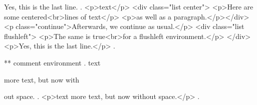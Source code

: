 Yes, this is the last line.
.
<p>text</p>
<div class="list center">
<p>Here are some centered<br>lines of text</p>
<p>as well as a paragraph.</p></div>
<p class="continue">Afterwards, we continue as usual.</p>
<div class="list flushleft">
<p>The same is true<br>for a ﬂushleft environment.</p>
</div>
<p>Yes, this is the last line.</p>
.



** comment environment
.
text
\begin{comment}
    This is a comment.
    \end{comment
    still more comment.
\end{comment}
more text, but now with%
\begin{comment}
    This is a comment.
\end{comment}
out space.
.
<p>text more text, but now without space.</p>
.